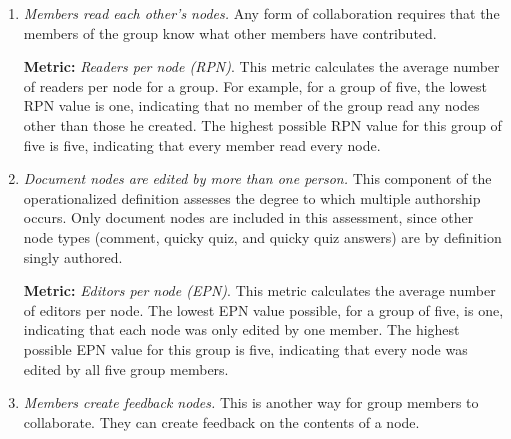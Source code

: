 \begin{enumerate}
\item{\em Members read each other's nodes.}  Any form of collaboration
  requires that the members of the group know what other members have
  contributed. 
  
  
  {\bf Metric:} {\em Readers per node (RPN)}.  This metric calculates the
  average number of readers per node for a group. For example, for a
  group of five, the lowest RPN value is one, indicating that no member
  of the group read any nodes other than those he created.  The highest
  possible RPN value for this group of five is five, indicating that every member
  read every node.
  
  
  
%  

\item{\em Document nodes are edited by more than one person.}  This
  component of the operationalized definition assesses the degree to
  which multiple authorship occurs.  Only document nodes are included in
  this assessment, since other node types (comment, quicky quiz, and
  quicky quiz answers) are by definition singly authored.  

  {\bf Metric:} {\em Editors per node (EPN)}.  This metric calculates the
  average number of editors per node.  The lowest EPN value possible, for
  a group of five, is one, indicating that each node was only edited by
  one member.  The highest possible EPN value for this group is five,
  indicating that every node was edited by all five group members.

\item{\em Members create feedback nodes.}  This is another way for group
  members to collaborate.  They can create feedback on the contents of a
  node.


\end{enumerate}
